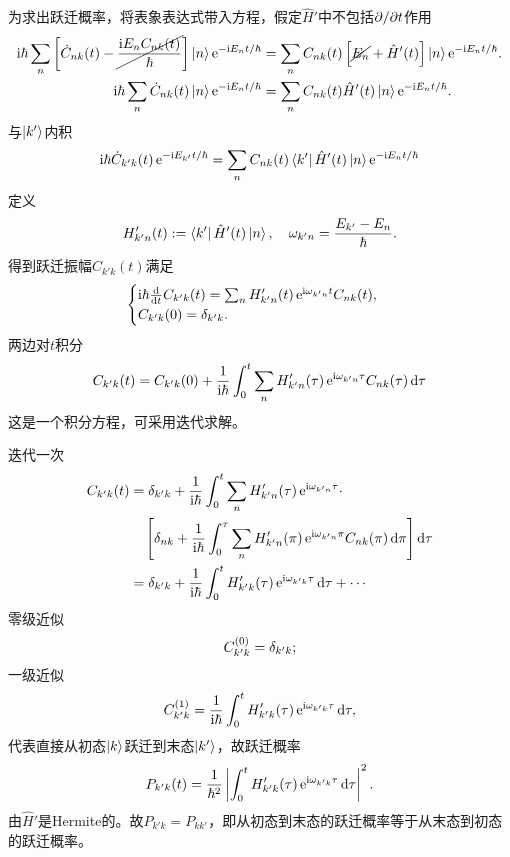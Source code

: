 为求出跃迁概率，将表象表达式带入\Schr 方程，假定$\hat H'$中不包括$\partial/\partial t$作用
{\small\begin{align}\notag
	\mathrm{i}\hbar\sum_n\left[\dot C_{nk}(t)-\cancel{\frac{\mathrm{i} E_nC_{nk}(t)}\hbar}\right]\left\vert n\right\rangle\mathop{}\!\mathrm{e}^{-\mathrm{i} E_nt/\hbar}&=\sum_nC_{nk}(t)\left[\cancel{E_n}+\hat H'(t)\right]\left\vert n\right\rangle\mathop{}\!\mathrm{e}^{-\mathrm{i} E_nt/\hbar}.\\
	\mathrm{i}\hbar\sum_n\dot C_{nk}(t)\left\vert n\right\rangle\mathop{}\!\mathrm{e}^{-\mathrm{i} E_nt/\hbar}&=\sum_nC_{nk}(t)\hat H'(t)\left\vert n\right\rangle\mathop{}\!\mathrm{e}^{-\mathrm{i} E_nt/\hbar}.
\end{align}}
与$\left\vert k'\right\rangle$内积
\begin{align}
	\mathrm{i}\hbar\dot C_{k'k}(t)\mathop{}\!\mathrm{e}^{-\mathrm{i} E_{k'}t/\hbar}=\sum_nC_{nk}(t)\left\langle k'\right\vert\hat H'(t)\left\vert n\right\rangle\mathop{}\!\mathrm{e}^{-\mathrm{i} E_nt/\hbar}
\end{align}
定义 
\begin{align}
	H_{k'n}'(t):=\left\langle k'\right\vert\hat H'(t)\left\vert n\right\rangle,\quad\omega_{k'n}=\frac{E_{k'}-E_n}\hbar.
\end{align}
得到跃迁振幅$C_{k'k}(t)$满足 
\begin{align}
	\begin{cases}
		\mathrm{i}\hbar\frac{\mathrm{d}^{\;\!\!}}{\mathrm{d} t^{\;\!\!}}C_{k'k}(t)=\sum_nH'_{k'n}(t)\mathop{}\!\mathrm{e}^{\mathrm{i}\omega_{k'n}t}C_{nk}(t),\\
		C_{k'k}(0)=\mathop{}\!\delta_{k'k}.
	\end{cases}
\end{align}
两边对$t$积分
\begin{align}
	C_{k'k}(t)=C_{k'k}(0)+\frac1{\mathrm{i}\hbar}\int_0^t\sum_nH'_{k'n}(\tau)\mathop{}\!\mathrm{e}^{\mathrm{i}\omega_{k'n}\tau}C_{nk}(\tau)\mathop{}\!\mathrm{d}\tau
\end{align}
这是一个积分方程，可采用迭代求解。

迭代一次
\begin{align*}
	C_{k'k}(t)&=\vd_{k'k}+\frac1{\i\hbar}\int_0^t\sum_nH'_{k'n}(\tau)\e{\i\omega_{k'n}\tau}\cdot\\
	&\quad\fkh{\vd_{nk}+\frac1{\i\hbar}\int_0^\tau\sum_nH'_{k'n}(\pi)\e{\i\omega_{k'n}\pi}C_{nk}(\pi)\d\pi}\d\tau\\
	&=\vd_{k'k}+\frac1{\i\hbar}\int_0^tH'_{k'k}(\tau)\e{\i\omega_{k'k}\tau}\d\tau+\cdots
\end{align*}
零级近似
\[
C_{k'k}^{(0)}=\mathop{}\!\delta_{k'k};
\]
一级近似 
\[
C_{k'k}^{(1)}=\frac1{\mathrm{i}\hbar}\int_0^tH'_{k'k}(\tau)\mathop{}\!\mathrm{e}^{\mathrm{i}\omega_{k'k}\tau}\mathop{}\!\mathrm{d}\tau,
\]
代表直接从初态$\left\vert k\right\rangle$跃迁到末态$\left\vert k'\right\rangle$，故跃迁概率
\begin{align}
	P_{k'k}(t)=\frac1{\hbar^2}\left\lvert\int_0^tH'_{k'k}(\tau)\mathop{}\!\mathrm{e}^{\mathrm{i}\omega_{k'k}\tau}\mathop{}\!\mathrm{d}\tau\right\rvert^2.
\end{align}
由$\hat H'$是Hermite的。故$P_{k'k}=P_{kk'}$，即从初态到末态的跃迁概率等于从末态到初态的跃迁概率。

